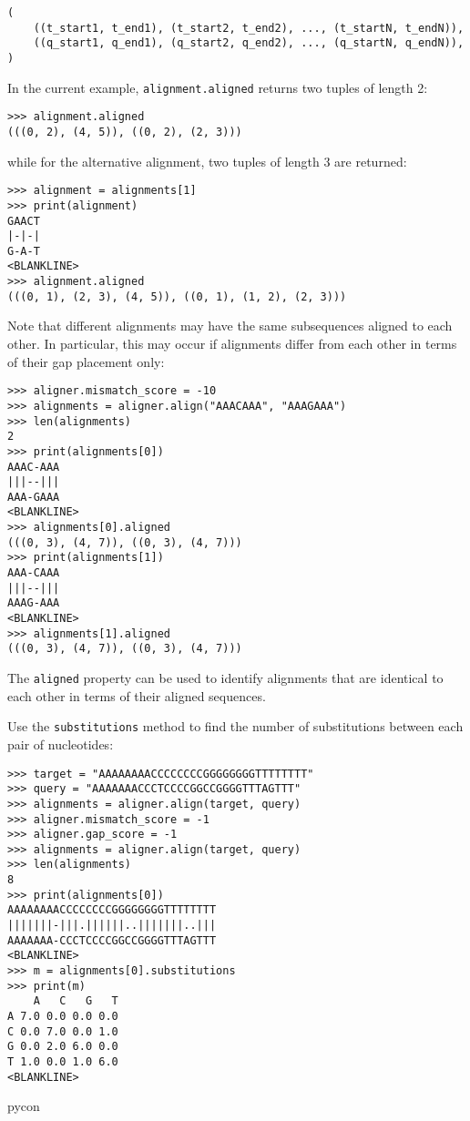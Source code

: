 \begin{verbatim}
(
    ((t_start1, t_end1), (t_start2, t_end2), ..., (t_startN, t_endN)),
    ((q_start1, q_end1), (q_start2, q_end2), ..., (q_startN, q_endN)),
)
\end{verbatim}

In the current example, \verb+alignment.aligned+ returns two tuples of length 2:

\begin{verbatim}
>>> alignment.aligned
(((0, 2), (4, 5)), ((0, 2), (2, 3)))
\end{verbatim}
while for the alternative alignment, two tuples of length 3 are returned:

\begin{verbatim}
>>> alignment = alignments[1]
>>> print(alignment)
GAACT
|-|-|
G-A-T
<BLANKLINE>
>>> alignment.aligned
(((0, 1), (2, 3), (4, 5)), ((0, 1), (1, 2), (2, 3)))
\end{verbatim}
Note that different alignments may have the same subsequences aligned to each other. In particular, this may occur if alignments differ from each other in terms of their gap placement only:

\begin{verbatim}
>>> aligner.mismatch_score = -10
>>> alignments = aligner.align("AAACAAA", "AAAGAAA")
>>> len(alignments)
2
>>> print(alignments[0])
AAAC-AAA
|||--|||
AAA-GAAA
<BLANKLINE>
>>> alignments[0].aligned
(((0, 3), (4, 7)), ((0, 3), (4, 7)))
>>> print(alignments[1])
AAA-CAAA
|||--|||
AAAG-AAA
<BLANKLINE>
>>> alignments[1].aligned
(((0, 3), (4, 7)), ((0, 3), (4, 7)))
\end{verbatim}
The \verb+aligned+ property can be used to identify alignments that are identical to each other in terms of their aligned sequences.

Use the \verb+substitutions+ method to find the number of substitutions between each pair of nucleotides:
\begin{verbatim}
>>> target = "AAAAAAAACCCCCCCCGGGGGGGGTTTTTTTT"
>>> query = "AAAAAAACCCTCCCCGGCCGGGGTTTAGTTT"
>>> alignments = aligner.align(target, query)
>>> aligner.mismatch_score = -1
>>> aligner.gap_score = -1
>>> alignments = aligner.align(target, query)
>>> len(alignments)
8
>>> print(alignments[0])
AAAAAAAACCCCCCCCGGGGGGGGTTTTTTTT
|||||||-|||.||||||..|||||||..|||
AAAAAAA-CCCTCCCCGGCCGGGGTTTAGTTT
<BLANKLINE>
>>> m = alignments[0].substitutions
>>> print(m)
    A   C   G   T
A 7.0 0.0 0.0 0.0
C 0.0 7.0 0.0 1.0
G 0.0 2.0 6.0 0.0
T 1.0 0.0 1.0 6.0
<BLANKLINE>
\end{verbatim}{pycon}

